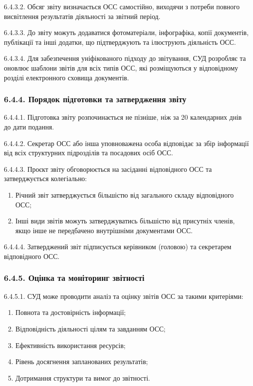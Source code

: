         6.4.3.2. Обсяг звіту визначається ОСС самостійно, виходячи з потреби повного висвітлення результатів діяльності за звітний період.
        
        6.4.3.3. До звіту можуть додаватися фотоматеріали, інфографіка, копії документів, публікації та інші додатки, що підтверджують та ілюструють діяльність ОСС.
        
        6.4.3.4. Для забезпечення уніфікованого підходу до звітування, СУД розробляє та оновлює шаблони звітів для всіх типів ОСС, які розміщуються у відповідному розділі електронного сховища документів.

    \subsubsection*{6.4.4. Порядок підготовки та затвердження звіту}
        6.4.4.1. Підготовка звіту розпочинається не пізніше, ніж за 20 календарних днів до дати подання.
        
        6.4.4.2. Секретар ОСС або інша уповноважена особа відповідає за збір інформації від всіх структурних підрозділів та посадових осіб ОСС.
        
        6.4.4.3. Проєкт звіту обговорюється на засіданні відповідного ОСС та затверджується колегіально:

            \begin{enumerate}[label=\alph*)]
                \item Річний звіт затверджується більшістю від загального складу відповідного ОСС;
                \item Інші види звітів можуть затверджуватись більшістю від присутніх членів, якщо інше не передбачено внутрішніми документами ОСС.
            \end{enumerate}
            
        6.4.4.4. Затверджений звіт підписується керівником (головою) та секретарем відповідного ОСС.

    \subsubsection*{6.4.5. Оцінка та моніторинг звітності}
        6.4.5.1. СУД може проводити аналіз та оцінку звітів ОСС за такими критеріями:

            \begin{enumerate}[label=\alph*)]
                \item Повнота та достовірність інформації;
                \item Відповідність діяльності цілям та завданням ОСС;
                \item Ефективність використання ресурсів;
                \item Рівень досягнення запланованих результатів;
                \item Дотримання структури та вимог до звітності.
            \end{enumerate}
            
